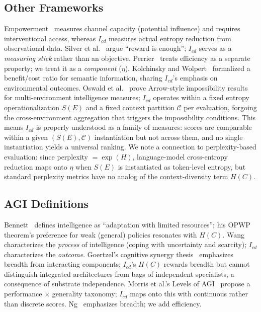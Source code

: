 \documentclass[runningheads,a4paper]{llncs}
\begin{document}
\subsection{Other Frameworks}
\label{sec:other}

Empowerment~\cite{salge2014empowerment,hayashi2025empowerment} measures channel capacity (potential influence) and requires interventional access, whereas $I_{cd}$ measures actual entropy reduction from observational data. Silver et al.~\cite{silver2021reward} argue ``reward is enough''; $I_{cd}$ serves as a \emph{measuring stick} rather than an objective. Perrier~\cite{perrier2025watts} treats efficiency as a separate property; we treat it as a \emph{component} ($\eta$). Kolchinsky and Wolpert~\cite{kolchinsky2018semantic} formalized a benefit/cost ratio for semantic information, sharing $I_{cd}$'s emphasis on environmental outcomes. Oswald et al.~\cite{oswald2025arrow} prove Arrow-style impossibility results for multi-environment intelligence measures; $I_{cd}$ operates within a fixed entropy operationalization $S(E)$ and a fixed context partition $\mathcal{C}$ per evaluation, forgoing the cross-environment aggregation that triggers the impossibility conditions. This means $I_{cd}$ is properly understood as a family of measures: scores are comparable within a given $(S(E), \mathcal{C})$ instantiation but not across them, and no single instantiation yields a universal ranking. We note a connection to perplexity-based evaluation: since perplexity $= \exp(H)$, language-model cross-entropy reduction maps onto $\eta$ when $S(E)$ is instantiated as token-level entropy, but standard perplexity metrics have no analog of the context-diversity term $H(C)$.

\subsection{AGI Definitions}
\label{sec:agi-defs}

Bennett~\cite{bennett2025agi} defines intelligence as ``adaptation with limited resources''; his OPWP theorem's preference for weak (general) policies resonates with $H(C)$. Wang~\cite{wang2006rigid} characterizes the \emph{process} of intelligence (coping with uncertainty and scarcity); $I_{cd}$ characterizes the \emph{outcome}. Goertzel's cognitive synergy thesis~\cite{goertzel2009cognitive} emphasizes breadth from interacting components; $I_{cd}$'s $H(C)$ rewards breadth but cannot distinguish integrated architectures from bags of independent specialists, a consequence of substrate independence. Morris et al.'s Levels of AGI~\cite{morris2023levels} propose a performance $\times$ generality taxonomy; $I_{cd}$ maps onto this with continuous rather than discrete scores. Ng~\cite{ng2025intelligence} emphasizes breadth; we add efficiency.
\end{document}
